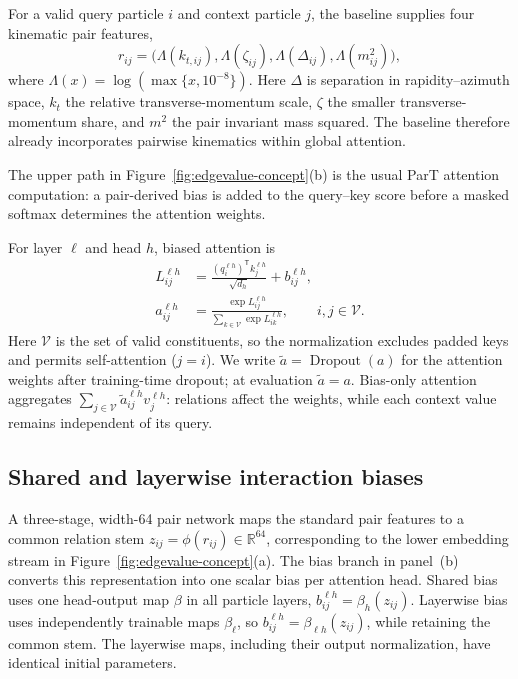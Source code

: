 For a valid query particle $i$ and context particle $j$, the baseline supplies four kinematic pair features,
\begin{equation}
 r_{ij}
 = \bigl(\Lambda(k_{t,ij}),\Lambda(\zeta_{ij}),
          \Lambda(\Delta_{ij}),\Lambda(m^2_{ij})\bigr),
 \label{eq:standard-pairs}
\end{equation}
where $\Lambda(x)=\log(\max\{x,10^{-8}\})$. Here $\Delta$ is separation in
rapidity--azimuth space, $k_t$ the relative transverse-momentum scale,
$\zeta$ the smaller transverse-momentum share, and $m^2$ the pair invariant
mass squared. The baseline therefore already incorporates pairwise kinematics
within global attention.

The upper path in Figure~\ref{fig:edgevalue-concept}(b) is the usual ParT
attention computation: a pair-derived bias is added to the query--key score
before a masked softmax determines the attention weights.

For layer $\ell$ and head $h$, biased attention is~\cite{Vaswani2017Attention,Qu2022ParticleTransformer}
\begin{equation}
 \begin{aligned}
 L^{\ell h}_{ij}
 &=\frac{(q_i^{\ell h})^{\mathsf T}k_j^{\ell h}}{\sqrt{d_h}}
       +b^{\ell h}_{ij},\\
 a^{\ell h}_{ij}
 &=\frac{\exp L^{\ell h}_{ij}}
        {\sum_{k\in\mathcal V}\exp L^{\ell h}_{ik}},
 \qquad i,j\in\mathcal V.
 \end{aligned}
 \label{eq:biased-attention}
\end{equation}
Here $\mathcal V$ is the set of valid constituents, so the normalization excludes
padded keys and permits self-attention ($j=i$). We write
$\widetilde a=\operatorname{Dropout}(a)$ for the attention weights after
training-time dropout; at evaluation $\widetilde a=a$.
Bias-only attention aggregates $\sum_{j\in\mathcal V}\widetilde a^{\ell h}_{ij}v_j^{\ell h}$:
relations affect the weights, while each context value remains independent of its query.

\subsection{Shared and layerwise interaction biases}

A three-stage, width-64 pair network maps the standard pair features to a
common relation stem $z_{ij}=\phi(r_{ij})\in\mathbb R^{64}$, corresponding
to the lower embedding stream in Figure~\ref{fig:edgevalue-concept}(a).
The bias branch in panel~(b) converts this representation into one scalar
bias per attention head.
Shared bias uses one head-output map $\beta$ in all particle layers,
$b^{\ell h}_{ij}=\beta_h(z_{ij})$. Layerwise bias uses independently trainable
maps $\beta_\ell$, so $b^{\ell h}_{ij}=\beta_{\ell h}(z_{ij})$, while retaining
the common stem. The layerwise maps, including their output normalization,
have identical initial parameters.

